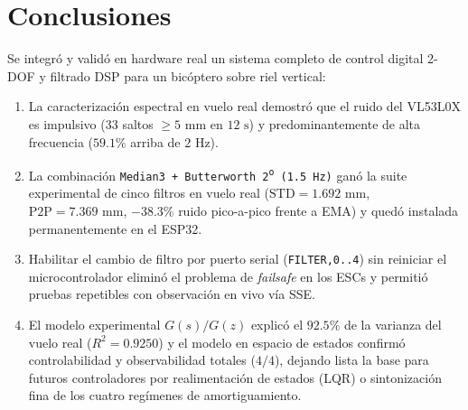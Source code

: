 \documentclass[conference]{IEEEtran}
\begin{document}
\section{Conclusiones}
Se integr\'{o} y valid\'{o} en hardware real un sistema completo de control digital 2-DOF y filtrado DSP para un bic\'{o}ptero sobre riel vertical:
\begin{enumerate}
  \item La caracterizaci\'{o}n espectral en vuelo real demostr\'{o} que el ruido del VL53L0X es impulsivo ($33$ saltos $\ge 5\text{ mm}$ en $12\text{ s}$) y predominantemente de alta frecuencia ($59.1\%$ arriba de $2\text{ Hz}$).
  \item La combinaci\'{o}n \texttt{Median3 + Butterworth 2\textsuperscript{o} (1.5 Hz)} gan\'{o} la suite experimental de cinco filtros en vuelo real ($\text{STD} = 1.692\text{ mm}$, $\text{P2P} = 7.369\text{ mm}$, $-38.3\%$ ruido pico-a-pico frente a EMA) y qued\'{o} instalada permanentemente en el ESP32.
  \item Habilitar el cambio de filtro por puerto serial (\texttt{FILTER,0..4}) sin reiniciar el microcontrolador elimin\'{o} el problema de \textit{failsafe} en los ESCs y permiti\'{o} pruebas repetibles con observaci\'{o}n en vivo v\'{i}a SSE.
  \item El modelo experimental $G(s)/G(z)$ explic\'{o} el $92.5\%$ de la varianza del vuelo real ($R^2 = 0.9250$) y el modelo en espacio de estados confirm\'{o} controlabilidad y observabilidad totales ($4/4$), dejando lista la base para futuros controladores por realimentaci\'{o}n de estados (LQR) o sintonizaci\'{o}n fina de los cuatro reg\'{i}menes de amortiguamiento.
\end{enumerate}



\end{document}
